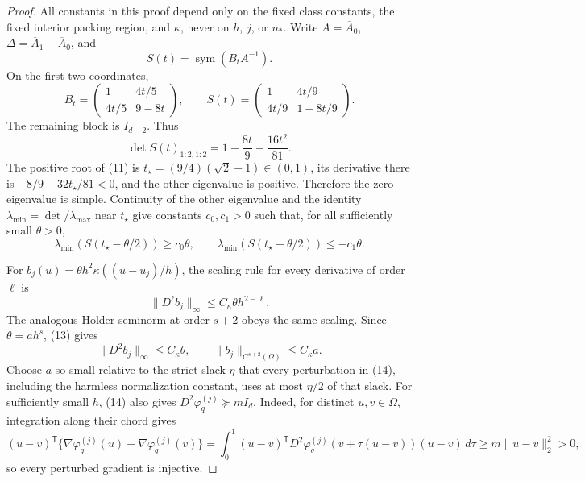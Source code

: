 \documentclass{article}
\begin{document}
\begin{proof}
All constants in this proof depend only on the fixed class constants, the fixed interior packing region, and \(\kappa\), never on \(h\), \(j\), or \(n_\ast\).  Write \(A=\overline A_0\), \(\Delta=\overline A_1-\overline A_0\), and
\[
 S(t)=\operatorname{sym}(B_tA^{-1}).
\]
On the first two coordinates,
\[
 B_t=
 \begin{pmatrix}1&4t/5\\4t/5&9-8t\end{pmatrix},
 \qquad
 S(t)=
 \begin{pmatrix}1&4t/9\\4t/9&1-8t/9\end{pmatrix}.
 \tag{10}
\]
The remaining block is \(I_{d-2}\).  Thus
\[
 \det S(t)_{1:2,1:2}=1-\frac{8t}{9}-\frac{16t^2}{81}.
 \tag{11}
\]
The positive root of (11) is \(t_\star=(9/4)(\sqrt2-1)\in(0,1)\), its derivative there is \(-8/9-32t_\star/81<0\), and the other eigenvalue is positive.  Therefore the zero eigenvalue is simple.  Continuity of the other eigenvalue and the identity \(\lambda_{\min}=\det/\lambda_{\max}\) near \(t_\star\) give constants \(c_0,c_1>0\) such that, for all sufficiently small \(\theta>0\),
\[
 \lambda_{\min}(S(t_\star-\theta/2))\ge c_0\theta,
 \qquad
 \lambda_{\min}(S(t_\star+\theta/2))\le-c_1\theta.
 \tag{12}
\]

For \(b_j(u)=\theta h^2\kappa((u-u_j)/h)\), the scaling rule for every derivative of order \(\ell\) is
\[
 \lVert D^\ell b_j\rVert_\infty
 \le C_\kappa\theta h^{2-\ell}.
 \tag{13}
\]
The analogous Holder seminorm at order \(s+2\) obeys the same scaling.  Since \(\theta=ah^s\), (13) gives
\[
 \lVert D^2b_j\rVert_\infty\le C_\kappa\theta,
 \qquad
 \lVert b_j\rVert_{C^{s+2}(\Omega)}\le C_\kappa a.
 \tag{14}
\]
Choose \(a\) so small relative to the strict slack \(\eta\) that every perturbation in (14), including the harmless normalization constant, uses at most \(\eta/2\) of that slack.  For sufficiently small \(h\), (14) also gives \(D^2\varphi_q^{(j)}\succeq mI_d\).  Indeed, for distinct \(u,v\in\Omega\), integration along their chord gives
\[
 (u-v)^{\mathsf T}\{\nabla\varphi_q^{(j)}(u)-\nabla\varphi_q^{(j)}(v)\}
 =\int_0^1 (u-v)^{\mathsf T}D^2\varphi_q^{(j)}(v+\tau(u-v))(u-v)\,d\tau
 \ge m\lVert u-v\rVert_2^2>0,
\]
so every perturbed gradient is injective.


\end{proof}
\end{document}
